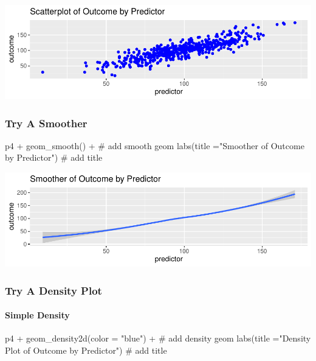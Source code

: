 \documentclass[12pt,]{article}
\newenvironment{Shaded}{}{}
\newcommand{\CommentTok}[1]{\textcolor[rgb]{0.00,0.50,0.00}{#1}}
\newcommand{\DataTypeTok}[1]{#1}
\newcommand{\KeywordTok}[1]{\textcolor[rgb]{0.00,0.00,1.00}{#1}}
\newcommand{\NormalTok}[1]{#1}
\newcommand{\OperatorTok}[1]{#1}
\newcommand{\StringTok}[1]{\textcolor[rgb]{0.00,0.50,0.50}{#1}}
\let\oldparagraph\paragraph
\renewcommand{\paragraph}[1]{\oldparagraph{#1}\mbox{}}
\begin{document}
\includegraphics{introduction-to-ggplot2_files/figure-latex/unnamed-chunk-17-1.pdf}

\hypertarget{try-a-smoother}{%
\subsubsection{Try A Smoother}\label{try-a-smoother}}

\begin{Shaded}
\begin{Highlighting}[]
\NormalTok{p4 }\OperatorTok{+}\StringTok{ }
\StringTok{  }\KeywordTok{geom_smooth}\NormalTok{() }\OperatorTok{+}\StringTok{ }\CommentTok{# add smooth geom}
\StringTok{  }\KeywordTok{labs}\NormalTok{(}\DataTypeTok{title =}\StringTok{"Smoother of Outcome by Predictor"}\NormalTok{) }\CommentTok{# add title}
\end{Highlighting}
\end{Shaded}

\includegraphics{introduction-to-ggplot2_files/figure-latex/unnamed-chunk-18-1.pdf}

\hypertarget{try-a-density-plot}{%
\subsubsection{Try A Density Plot}\label{try-a-density-plot}}

\hypertarget{simple-density}{%
\paragraph{Simple Density}\label{simple-density}}

\begin{Shaded}
\begin{Highlighting}[]
\NormalTok{p4 }\OperatorTok{+}\StringTok{ }
\StringTok{  }\KeywordTok{geom_density2d}\NormalTok{(}\DataTypeTok{color =} \StringTok{"blue"}\NormalTok{) }\OperatorTok{+}\StringTok{ }\CommentTok{# add density geom }
\StringTok{  }\KeywordTok{labs}\NormalTok{(}\DataTypeTok{title =}\StringTok{"Density Plot of Outcome by Predictor"}\NormalTok{) }\CommentTok{# add title}
\end{Highlighting}
\end{Shaded}
\end{document}

